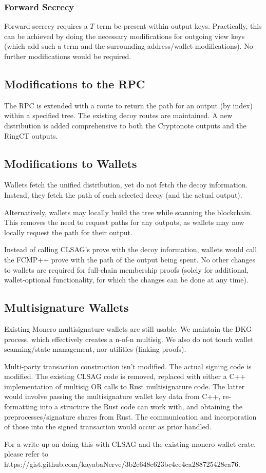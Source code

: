 \documentclass[]{article}
\begin{document}
\subsubsection{Forward Secrecy}

Forward secrecy requires a $T$ term be present within output keys. Practically, this can be achieved by doing the necessary modifications for outgoing view keys (which add such a term and the surrounding address/wallet modifications). No further modifications would be required.

\subsection{Modifications to the RPC}

The RPC is extended with a route to return the path for an output (by index) within a specified tree. The existing decoy routes are maintained. A new distribution is added comprehensive to both the Cryptonote outputs and the RingCT outputs.

\subsection{Modifications to Wallets}

Wallets fetch the unified distribution, yet do not fetch the decoy information. Instead, they fetch the path of each selected decoy (and the actual output).

Alternatively, wallets may locally build the tree while scanning the blockchain. This removes the need to request paths for any outputs, as wallets may now locally request the path for their output.

Instead of calling CLSAG's prove with the decoy information, wallets would call the FCMP++ prove with the path of the output being spent. No other changes to wallets are required for full-chain membership proofs (solely for additional, wallet-optional functionality, for which the changes can be done at any time).

\subsection{Multisignature Wallets}

Existing Monero multisignature wallets are still usable. We maintain the DKG process, which effectively creates a n-of-n multisig. We also do not touch wallet scanning/state management, nor utilities (linking proofs).

Multi-party transaction construction isn't modified. The actual signing code is modified. The existing CLSAG code is removed, replaced with either a C++ implementation of multisig OR calls to Rust multisignature code. The latter would involve passing the multisignature wallet key data from C++, re-formatting into a structure the Rust code can work with, and obtaining the preprocesses/signature shares from Rust. The communication and incorporation of those into the signed transaction would occur as prior handled.

For a write-up on doing this with CLSAG and the existing monero-wallet crate, please refer to https://gist.github.com/kayabaNerve/3b2c648c623bc4ce4ca288725428ea76.
\end{document}

